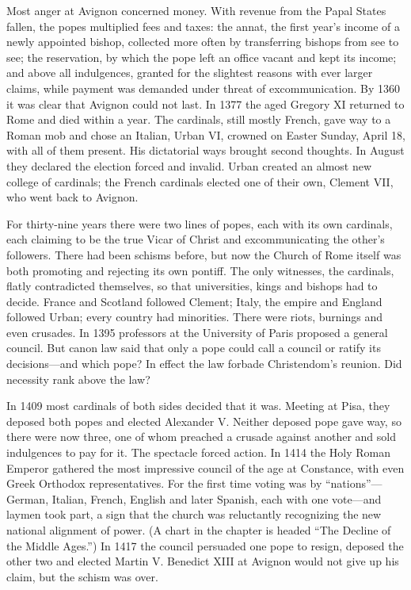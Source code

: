 Most anger at Avignon concerned money. With revenue from the Papal States fallen, the popes multiplied
fees and taxes: the annat, the first year's income of a newly appointed bishop, collected more often
by transferring bishops from see to see; the reservation, by which the pope left an office vacant and
kept its income; and above all indulgences, granted for the slightest reasons with ever larger
claims, while payment was demanded under threat of excommunication. By 1360 it was clear that Avignon
could not last. In 1377 the aged Gregory XI returned to Rome and died within a year. The cardinals,
still mostly French, gave way to a Roman mob and chose an Italian, Urban VI, crowned on Easter Sunday,
April 18, with all of them present. His dictatorial ways brought second thoughts. In August they
declared the election forced and invalid. Urban created an almost new college of cardinals; the
French cardinals elected one of their own, Clement VII, who went back to Avignon.

For thirty-nine years there were two lines of popes, each with its own cardinals, each claiming to be
the true Vicar of Christ and excommunicating the other's followers. There had been schisms before, but
now the Church of Rome itself was both promoting and rejecting its own pontiff. The only witnesses,
the cardinals, flatly contradicted themselves, so that universities, kings and bishops had to decide.
France and Scotland followed Clement; Italy, the empire and England followed Urban; every country had
minorities. There were riots, burnings and even crusades. In 1395 professors at the University of
Paris proposed a general council. But canon law said that only a pope could call a council or ratify
its decisions---and which pope? In effect the law forbade Christendom's reunion. Did necessity rank above the law?

In 1409 most cardinals of both sides decided that it was. Meeting at Pisa, they deposed both popes
and elected Alexander V. Neither deposed pope gave way, so there were now three, one of whom preached
a crusade against another and sold indulgences to pay for it. The spectacle forced action. In 1414
the Holy Roman Emperor gathered the most impressive council of the age at Constance, with even Greek
Orthodox representatives. For the first time voting was by ``nations''---German, Italian, French,
English and later Spanish, each with one vote---and laymen took part, a sign that the church was
reluctantly recognizing the new national alignment of power. (A chart in the chapter is headed ``The
Decline of the Middle Ages.'') In 1417 the council persuaded one pope to resign, deposed the other
two and elected Martin V. Benedict XIII at Avignon would not give up his claim, but the schism was over.

